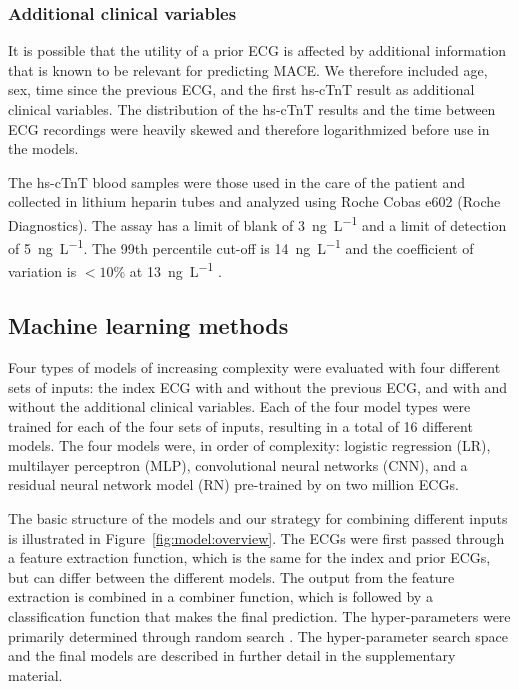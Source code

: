 \documentclass[preprint]{elsarticle}
\begin{document}
\subsubsection{Additional clinical variables}
It is possible that the utility of a prior ECG is affected by additional information that is known to be relevant for predicting MACE. We therefore included age, sex, time since the previous ECG, and the first hs-cTnT result as additional clinical variables. The distribution of the hs-cTnT results and the time between ECG recordings were heavily skewed and therefore logarithmized before use in the models. 

The hs-cTnT blood samples were those used in the care of the patient and collected in lithium heparin tubes and analyzed using Roche Cobas e602 (Roche Diagnostics). The assay has a limit of blank of \SI{3}{\nano\gram\per\liter} and a limit of detection of \SI{5}{\nano\gram\per\liter}. The 99th percentile cut-off is \SI{14}{\nano\gram\per\liter} and the coefficient of variation is $<10\%$ at \SI{13}{\nano\gram\per\liter} \citep{giannitsis2010}.


\subsection{Machine learning methods}
Four types of models of increasing complexity were evaluated with four different sets of inputs: the index ECG with and without the previous ECG, and with and without the additional clinical variables. Each of the four model types were trained for each of the four sets of inputs, resulting in a total of 16 different models. The four models were, in order of complexity: logistic regression (LR), multilayer perceptron (MLP), convolutional neural networks (CNN), and a residual neural network model (RN) pre-trained by \citet{ribeiro2020} on two million ECGs.

The basic structure of the models and our strategy for combining different inputs is illustrated in Figure~\ref{fig:model:overview}. The ECGs were first passed through a feature extraction function, which is the same for the index and prior ECGs, but can differ between the different models. The output from the feature extraction is combined in a combiner function, which is followed by a classification function that makes the final prediction. The hyper-parameters were primarily determined through random search \citep{bergstra2012}. The hyper-parameter search space and the final models are described in further detail in the supplementary material.
\end{document}
